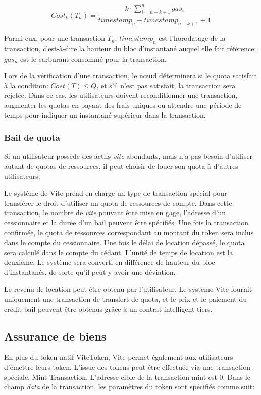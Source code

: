\documentclass[UTF8,nofonts]{article}
\begin{document}
\begin{multicols}{2}
\begin{equation}
Cost_{k}(T_n) = \frac{k \cdot \sum_{i=n-k+1}^{n}gas_{i}}{timestamp_{n} - timestamp_{n-k+1} + 1} 
\end{equation}

Parmi eux, pour une transaction $T_n$, $timestamp_n$ est l'horodatage de la transaction, c'est-à-dire la hauteur du bloc d'instantané auquel elle fait référence; $gas_n$ est le carburant consommé pour la transaction.

Lors de la vérification d'une transaction, le nœud déterminera si le quota satisfait à la condition: $Cost(T) \leq Q$, et s'il n'est pas satisfait, la transaction sera rejetée. Dans ce cas, les utilisateurs doivent reconditionner une transaction, augmenter les quotas en payant des frais uniques ou attendre une période de temps pour indiquer un instantané supérieur dans la transaction.

\subsubsection{Bail de quota}

Si un utilisateur possède des actifs  \textit{vite} abondants, mais n'a pas besoin d'utiliser autant de quotas de ressources, il peut choisir de louer son quota à d'autres utilisateurs.

Le système de Vite prend en charge un type de transaction spécial pour transférer le droit d'utiliser un quota de ressources de compte. Dans cette transaction, le nombre de \textit{vite} pouvant être mise en gage, l'adresse d'un cessionnaire et la durée d'un bail peuvent être spécifiés. Une fois la transaction confirmée, le quota de ressources correspondant au montant du token sera inclus dans le compte du cessionnaire. Une fois le délai de location dépassé, le quota sera calculé dans le compte du cédant. L'unité de temps de location est la deuxième. Le système sera converti en différence de hauteur du bloc d'instantanés, de sorte qu'il peut y avoir une déviation.

Le revenu de location peut être obtenu par l'utilisateur. Le système Vite fournit uniquement une transaction de transfert de quota, et le prix et le paiement du crédit-bail peuvent être obtenus grâce à un contrat intelligent tiers.

\subsection{Assurance de biens}
En plus du token natif ViteToken, Vite permet également aux utilisateurs d'émettre leurs token.  L'issue des tokens peut être effectuée via une transaction spéciale, Mint Transaction. L'adresse cible de la transaction mint est 0. Dans le champ \textit{data} de la transaction, les paramètres du token sont spécifiés comme suit:


\end{multicols}
\end{document}
